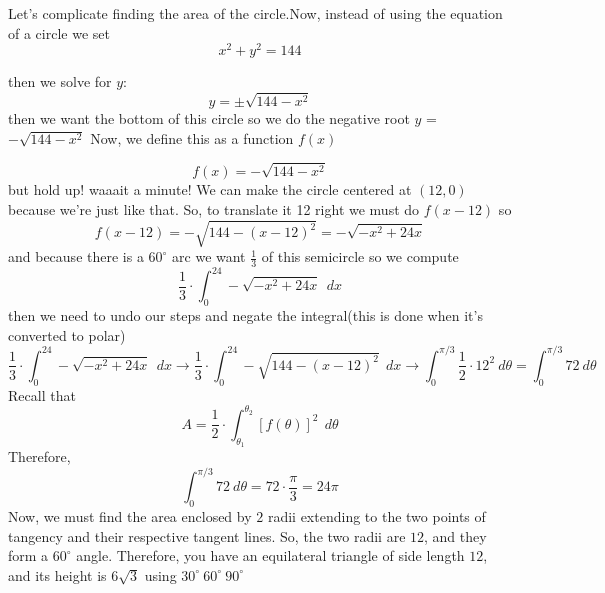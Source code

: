 \begin{enumerate}
 Let's complicate finding the area of the circle.Now, instead of using the equation of a circle we set 
 \[x^2 + y^2 = 144\]

 then we solve for $y$: 
 \[y = \pm\sqrt{144 - x^2}\] then we want the bottom of this circle so we do the negative root $y$ = $-\sqrt{144 - x^2}$ Now, we define this as a function $f(x)$

 \[f(x) = -\sqrt{144 - x^2}\] but hold up! waaait a minute! We can make the circle centered at $(12,0)$ because we're just like that. So, to translate it 12 right we must do $f(x - 12)$ so 
 \[f(x - 12) = -\sqrt{144 - (x - 12)^2} = -\sqrt{-x^2 + 24x}\] and because there is a $60 ^\circ$  arc we want $\frac{1}{3}$ of this semicircle so we compute 
 \[\frac{1}{3} \cdot \int_{0}^{24} -\sqrt{-x^2 + 24x} \ \  dx\] then we need to undo our steps and negate the integral(this is done when it's converted to polar) 
 \[\frac{1}{3} \cdot \int_{0}^{24} -\sqrt{-x^2 + 24x} \ \ dx \rightarrow \frac{1}{3} \cdot \int_{0}^{24} -\sqrt{144-(x-12)^2}\ \ dx \rightarrow \int_0^{\pi/3} \frac{1}{2} \cdot 12^2  \ d\theta = \int_0^{\pi/3} 72 \ d\theta\]Recall that
 \[A= \frac{1}{2} \cdot \int_{\theta_1}^{\theta_2} [f(\theta)]^2 \  \ d\theta\]Therefore,
 \[\int_0^{\pi/3} 72 \  d\theta = 72 \cdot \frac{\pi}{3} = 24\pi\]Now, we must find the area enclosed by $2$ radii extending to the two points of tangency and their respective tangent lines. So, the two radii are $12$, and they form a  $60^\circ$ angle. Therefore, you have an equilateral triangle of side length $12$, and its height is $6\sqrt{3}$ using $30^\circ \ 60^\circ \ 90^\circ$ 


\end{enumerate}
